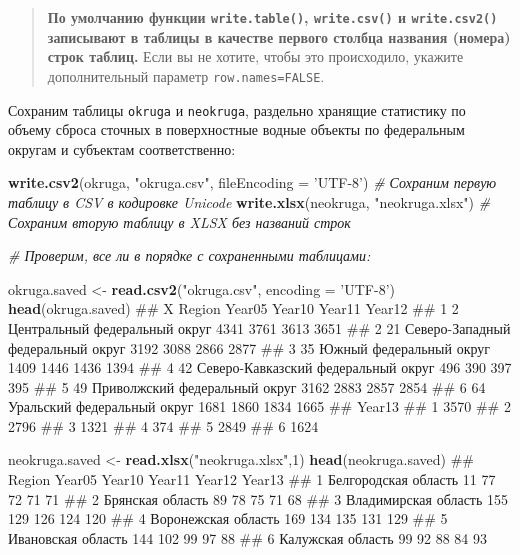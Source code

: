\documentclass[]{book}
\newenvironment{Shaded}{\begin{snugshade}}{\end{snugshade}}
\newcommand{\KeywordTok}[1]{\textcolor[rgb]{0.13,0.29,0.53}{\textbf{#1}}}
\newcommand{\DataTypeTok}[1]{\textcolor[rgb]{0.13,0.29,0.53}{#1}}
\newcommand{\DecValTok}[1]{\textcolor[rgb]{0.00,0.00,0.81}{#1}}
\newcommand{\StringTok}[1]{\textcolor[rgb]{0.31,0.60,0.02}{#1}}
\newcommand{\CommentTok}[1]{\textcolor[rgb]{0.56,0.35,0.01}{\textit{#1}}}
\newcommand{\NormalTok}[1]{#1}
\begin{document}
\begin{quote}
\textbf{По умолчанию функции \texttt{write.table()},
\texttt{write.csv()} и \texttt{write.csv2()} записывают в таблицы в
качестве первого столбца названия (номера) строк таблиц.} Если вы не
хотите, чтобы это происходило, укажите дополнительный параметр
\texttt{row.names=FALSE}.
\end{quote}

Сохраним таблицы \texttt{okruga} и \texttt{neokruga}, раздельно хранящие
статистику по объему сброса сточных в поверхностные водные объекты по
федеральным округам и субъектам соответственно:

\begin{Shaded}
\begin{Highlighting}[]
\KeywordTok{write.csv2}\NormalTok{(okruga, }\StringTok{"okruga.csv"}\NormalTok{, }\DataTypeTok{fileEncoding =} \StringTok{'UTF-8'}\NormalTok{) }\CommentTok{# Сохраним первую таблицу в CSV в кодировке Unicode}
\KeywordTok{write.xlsx}\NormalTok{(neokruga, }\StringTok{"neokruga.xlsx"}\NormalTok{) }\CommentTok{# Сохраним вторую таблицу в XLSX без названий строк}

\CommentTok{# Проверим, все ли в порядке с сохраненными таблицами:}

\NormalTok{okruga.saved <-}\StringTok{ }\KeywordTok{read.csv2}\NormalTok{(}\StringTok{"okruga.csv"}\NormalTok{, }\DataTypeTok{encoding =} \StringTok{'UTF-8'}\NormalTok{)}
\KeywordTok{head}\NormalTok{(okruga.saved)}
\NormalTok{##    X                               Region Year05 Year10 Year11 Year12}
\NormalTok{## 1  2       Центральный федеральный округ    4341   3761   3613   3651}
\NormalTok{## 2 21   Северо-Западный федеральный округ    3192   3088   2866   2877}
\NormalTok{## 3 35             Южный федеральный округ    1409   1446   1436   1394}
\NormalTok{## 4 42 Северо-Кавказский федеральный округ     496    390    397    395}
\NormalTok{## 5 49       Приволжский федеральный округ    3162   2883   2857   2854}
\NormalTok{## 6 64         Уральский федеральный округ    1681   1860   1834   1665}
\NormalTok{##   Year13}
\NormalTok{## 1   3570}
\NormalTok{## 2   2796}
\NormalTok{## 3   1321}
\NormalTok{## 4    374}
\NormalTok{## 5   2849}
\NormalTok{## 6   1624}

\NormalTok{neokruga.saved <-}\StringTok{ }\KeywordTok{read.xlsx}\NormalTok{(}\StringTok{"neokruga.xlsx"}\NormalTok{,}\DecValTok{1}\NormalTok{)}
\KeywordTok{head}\NormalTok{(neokruga.saved)}
\NormalTok{##                 Region Year05 Year10 Year11 Year12 Year13}
\NormalTok{## 1 Белгородская область     11     77     72     71     71}
\NormalTok{## 2     Брянская область     89     78     75     71     68}
\NormalTok{## 3 Владимирская область    155    129    126    124    120}
\NormalTok{## 4  Воронежская область    169    134    135    131    129}
\NormalTok{## 5   Ивановская область    144    102     99     97     88}
\NormalTok{## 6    Калужская область     99     92     88     84     93}
\end{Highlighting}
\end{Shaded}
\end{document}
